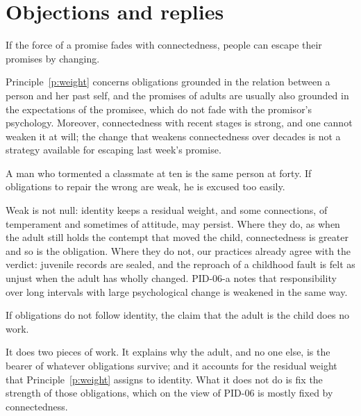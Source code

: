 \documentclass{situationist-preprint}
\begin{document}
\section{Objections and replies}

\begin{objection}[Promises]
If the force of a promise fades with connectedness, people can escape their promises by changing.
\end{objection}

\begin{reply}
Principle~\ref{p:weight} concerns obligations grounded in the relation between a person and her past self, and the promises of adults are usually also grounded in the expectations of the promisee, which do not fade with the promisor's psychology. Moreover, connectedness with recent stages is strong, and one cannot weaken it at will; the change that weakens connectedness over decades is not a strategy available for escaping last week's promise.
\end{reply}

\begin{objection}
A man who tormented a classmate at ten is the same person at forty. If obligations to repair the wrong are weak, he is excused too easily.
\end{objection}

\begin{reply}
Weak is not null: identity keeps a residual weight, and some connections, of temperament and sometimes of attitude, may persist. Where they do, as when the adult still holds the contempt that moved the child, connectedness is greater and so is the obligation. Where they do not, our practices already agree with the verdict: juvenile records are sealed, and the reproach of a childhood fault is felt as unjust when the adult has wholly changed. PID-06-a notes that responsibility over long intervals with large psychological change is weakened in the same way.
\end{reply}

\begin{objection}[Inconsistency]
If obligations do not follow identity, the claim that the adult is the child does no work.
\end{objection}

\begin{reply}
It does two pieces of work. It explains why the adult, and no one else, is the bearer of whatever obligations survive; and it accounts for the residual weight that Principle~\ref{p:weight} assigns to identity. What it does not do is fix the strength of those obligations, which on the view of PID-06 is mostly fixed by connectedness.
\end{reply}
\end{document}
